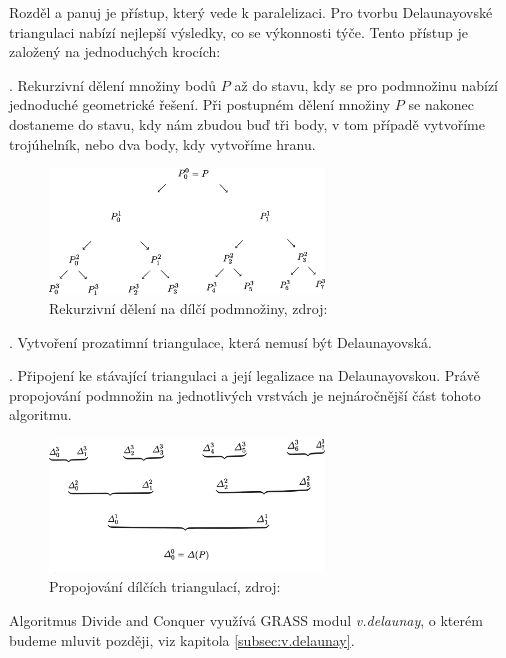 \documentclass[12pt,a4paper]{article}
\begin{document}
{Rozděl a panuj je přístup, který vede k paralelizaci. Pro tvorbu
Delaunayovské triangulaci nabízí nejlepší výsledky, co se výkonnosti
týče. Tento přístup je založený na jednoduchých krocích:

. Rekurzivní dělení množiny bodů $P$ až do stavu, kdy se
pro podmnožinu nabízí jednoduché geometrické řešení. Při postupném
dělení množiny $P$ se nakonec dostaneme do stavu, kdy nám zbudou buď
tři body, v tom případě vytvoříme trojúhelník, nebo dva body, kdy
vytvoříme hranu.
\begin{figure}[h!]
\centering
\includegraphics[width=0.65\textwidth]{img/div_n_conq.png}
\caption{Rekurzivní dělení na dílčí podmnožiny, zdroj: \cite{triangulation}}
\label{fig:div_n_conq}
\end{figure}

. Vytvoření prozatimní triangulace, která nemusí být
Delaunayovská.

. Připojení ke stávající triangulaci a její legalizace na
Delaunayovskou. Právě propojování podmnožin na jednotlivých vrstvách
je nejnáročnější část tohoto algoritmu.

\bigskip

\begin{figure}[h!]
\centering
\includegraphics[width=0.65\textwidth]{img/merge.png}
\caption{Propojování dílčích triangulací, zdroj: \cite{triangulation}}
\label{fig:merge}
\end{figure}

Algoritmus Divide and Conquer využívá GRASS modul \emph{v.delaunay}, o
kterém budeme mluvit později, viz kapitola \ref{subsec:v.delaunay}.


}
\end{document}

